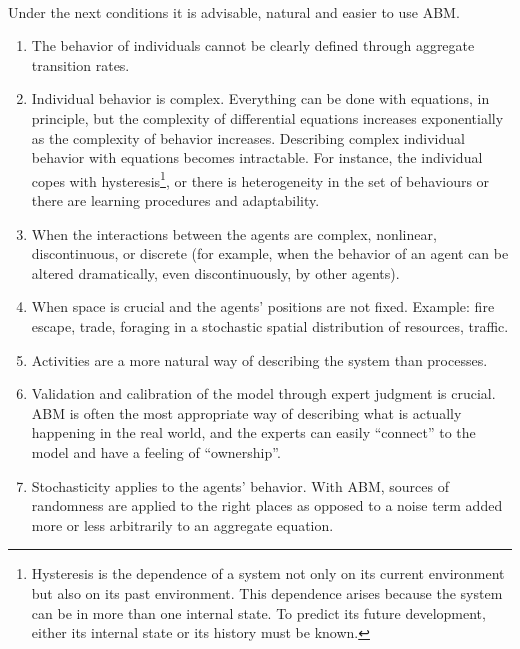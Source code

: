 \documentclass[11pt,oneside,a4paper,openright]{report}
\begin{document}
\\

Under the next conditions it is advisable, natural and easier to use ABM.

\begin{enumerate}[i-] 
\item The behavior of individuals cannot be clearly defined through aggregate transition rates.
\item Individual behavior is complex. Everything can be done with equations, in principle, but the complexity of differential equations increases exponentially as the complexity of behavior increases. Describing complex individual behavior with equations becomes intractable. For instance, the individual copes with hysteresis\footnote{Hysteresis is the dependence of a system not only on its current environment but also on its past environment. This dependence arises because the system can be in more than one internal state. To predict its future development, either its internal state or its history must be known\cite[p.571–597]{hysteresisDef}.}, or there is heterogeneity in the set of behaviours or there are learning procedures and adaptability.
\item When the interactions between the agents are complex, nonlinear, discontinuous, or discrete (for example, when the behavior of an agent can be altered dramatically, even discontinuously, by other agents).
\item When space is crucial and the agents' positions are not fixed. Example: fire escape, trade, foraging in a stochastic spatial distribution of resources, traffic.
\item Activities are a more natural way of describing the system than processes.
\item Validation and calibration of the model through expert judgment is crucial. ABM is often the most appropriate way of describing what is actually happening in the real world, and the experts can easily “connect” to the model and have a feeling of “ownership”. 
\item Stochasticity applies to the agents' behavior. With ABM, sources of randomness are applied to the right places as opposed to a noise term added more or less arbitrarily to an aggregate equation. 
\end{enumerate}
\end{document}
